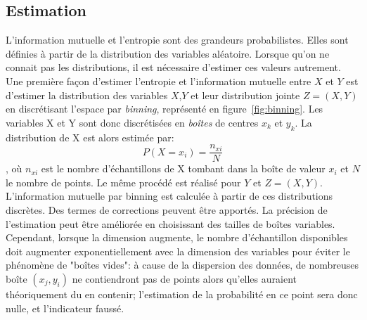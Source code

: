
\subsection{Estimation}




L'information mutuelle et l'entropie sont des grandeurs probabilistes. Elles sont définies à partir de la distribution des variables aléatoire. Lorsque qu'on ne connait pas les distributions, il est nécessaire d'estimer ces valeurs autrement. 
Une première façon d'estimer l'entropie et l'information mutuelle entre $X$ et $Y$ est d'estimer la distribution des variables $X$,$Y$ et leur distribution jointe $Z = (X,Y)$ en discrétisant l'espace par \emph{binning}, représenté en figure~\ref{fig:binning}. Les variables X et Y sont donc discrétisées en \emph{boîtes} de centres $x_k$ et $y_k$. La distribution de X est alors estimée par: 
$$P(X = x_i) = \frac{n_{xi}}{N} $$, où $n_{xi}$ est le nombre d'échantillons de X tombant dans la boîte de valeur $x_i$ et $N$ le nombre de points. Le même procédé est réalisé pour $Y$ et $Z = (X,Y)$.
L'information mutuelle par binning est calculée à partir de ces distributions discrètes.
Des termes de corrections peuvent être apportés. La précision de l'estimation peut être améliorée en choisissant des tailles de boîtes variables. Cependant, lorsque la dimension augmente, le nombre d'échantillon disponibles doit augmenter exponentiellement avec la dimension des variables pour éviter le phénomène de "boîtes vides": à cause de la dispersion des données, de nombreuses boîte $(x_j,y_i)$ ne contiendront pas de points alors qu'elles auraient théoriquement du en contenir; l'estimation de la probabilité en ce point sera donc nulle, et l'indicateur faussé. 

